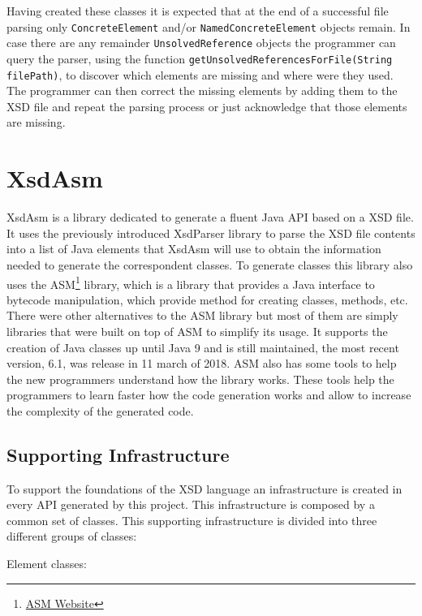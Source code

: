 \noindent
Having created these classes it is expected that at the end of a successful file parsing only \texttt{ConcreteElement} and/or \texttt{NamedConcreteElement} objects remain. In case there are any remainder \texttt{UnsolvedReference} objects the programmer can query the parser, using the function \texttt{getUnsolvedReferencesForFile(String filePath)}, to discover which elements are missing and where were they used. The programmer can then correct the missing elements by adding them to the \ac{XSD} file and repeat the parsing process or just acknowledge that those elements are missing. 

\section{XsdAsm} %
\label{sec:xsdasm}

XsdAsm is a library dedicated to generate a fluent Java \ac{API} based on a \ac{XSD} file. It uses the previously introduced XsdParser library to parse the \ac{XSD} file contents into a list of Java elements that XsdAsm will use to obtain the information needed to generate the correspondent classes. To generate classes this library also uses the ASM\footnote{\href{http://asm.ow2.org/}{ASM Website}} library, which is a library that provides a Java interface to bytecode manipulation, which provide method for creating classes, methods, etc. There were other alternatives to the ASM library but most of them are simply libraries that were built on top of ASM to simplify its usage. It supports the creation of Java classes up until Java 9 and is still maintained, the most recent version, 6.1, was release in 11 march of 2018. ASM also has some tools to help the new programmers understand how the library works. These tools help the programmers to learn faster how the code generation works and allow to increase the complexity of the generated code.

\subsection{Supporting Infrastructure}
\label{sec:supportinginfrastructure}

To support the foundations of the \ac{XSD} language an infrastructure is created in every \ac{API} generated by this project. This infrastructure is composed by a common set of classes. This supporting infrastructure is divided into three different groups of classes:

Element classes:

